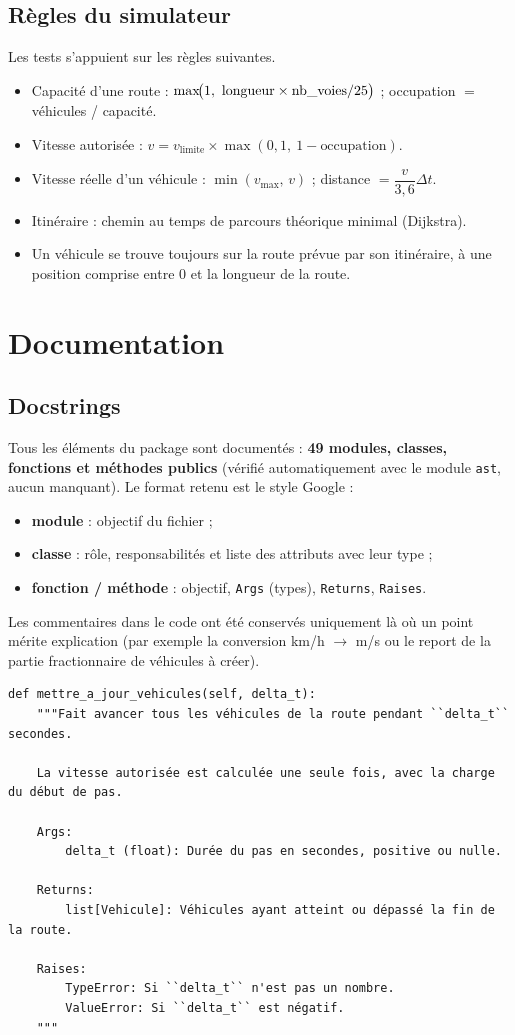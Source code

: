 \documentclass[12pt,a4paper]{report}
\begin{document}
\section{Règles du simulateur}
Les tests s'appuient sur les règles suivantes.
\begin{itemize}
  \item Capacité d'une route : $\max\!\bigl(1,\ \text{longueur}\times\text{nb\_\allowbreak{}voies}/25\bigr)$ ; occupation $=$ véhicules / capacité.
  \item Vitesse autorisée : $v=v_{\text{limite}}\times\max(0{,}1,\ 1-\text{occupation})$.
  \item Vitesse réelle d'un véhicule : $\min(v_{\max},\,v)$ ; distance $=\dfrac{v}{3{,}6}\Delta t$.
  \item Itinéraire : chemin au temps de parcours théorique minimal (Dijkstra).
  \item Un véhicule se trouve toujours sur la route prévue par son itinéraire, à une position comprise entre $0$ et la longueur de la route.
\end{itemize}

\chapter{Documentation}
\section{Docstrings}
Tous les éléments du package sont documentés : \textbf{49 modules, classes, fonctions et méthodes publics}
(vérifié automatiquement avec le module \texttt{ast}, aucun manquant). Le format retenu est le style Google :
\begin{itemize}
  \item \textbf{module} : objectif du fichier ;
  \item \textbf{classe} : rôle, responsabilités et liste des attributs avec leur type ;
  \item \textbf{fonction / méthode} : objectif, \texttt{Args} (types), \texttt{Returns}, \texttt{Raises}.
\end{itemize}
Les commentaires dans le code ont été conservés uniquement là où un point mérite explication
(par exemple la conversion km/h $\to$ m/s ou le report de la partie fractionnaire de véhicules à créer).

\begin{lstlisting}[caption={Exemple de docstring complète (\texttt{route.py})}]
def mettre_a_jour_vehicules(self, delta_t):
    """Fait avancer tous les véhicules de la route pendant ``delta_t`` secondes.

    La vitesse autorisée est calculée une seule fois, avec la charge du début de pas.

    Args:
        delta_t (float): Durée du pas en secondes, positive ou nulle.

    Returns:
        list[Vehicule]: Véhicules ayant atteint ou dépassé la fin de la route.

    Raises:
        TypeError: Si ``delta_t`` n'est pas un nombre.
        ValueError: Si ``delta_t`` est négatif.
    """
\end{lstlisting}
\end{document}
